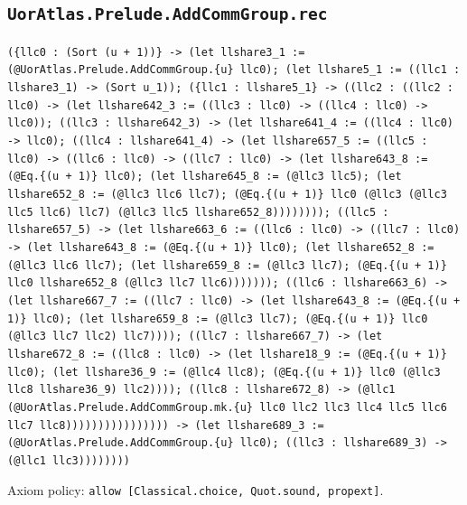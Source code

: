 \documentclass[11pt]{article}
\begin{document}
\subsection*{\texttt{UorAtlas.Prelude.AddCommGroup.rec}}
\noindent\texttt{(\{llc0 : (Sort (u + 1))\} -> (let llshare3\_1 := (@UorAtlas.Prelude.AddCommGroup.\{u\} llc0); (let llshare5\_1 := ((llc1 : llshare3\_1) -> (Sort u\_1)); (\{llc1 : llshare5\_1\} -> ((llc2 : ((llc2 : llc0) -> (let llshare642\_3 := ((llc3 : llc0) -> ((llc4 : llc0) -> llc0)); ((llc3 : llshare642\_3) -> (let llshare641\_4 := ((llc4 : llc0) -> llc0); ((llc4 : llshare641\_4) -> (let llshare657\_5 := ((llc5 : llc0) -> ((llc6 : llc0) -> ((llc7 : llc0) -> (let llshare643\_8 := (@Eq.\{(u + 1)\} llc0); (let llshare645\_8 := (@llc3 llc5); (let llshare652\_8 := (@llc3 llc6 llc7); (@Eq.\{(u + 1)\} llc0 (@llc3 (@llc3 llc5 llc6) llc7) (@llc3 llc5 llshare652\_8)))))))); ((llc5 : llshare657\_5) -> (let llshare663\_6 := ((llc6 : llc0) -> ((llc7 : llc0) -> (let llshare643\_8 := (@Eq.\{(u + 1)\} llc0); (let llshare652\_8 := (@llc3 llc6 llc7); (let llshare659\_8 := (@llc3 llc7); (@Eq.\{(u + 1)\} llc0 llshare652\_8 (@llc3 llc7 llc6))))))); ((llc6 : llshare663\_6) -> (let llshare667\_7 := ((llc7 : llc0) -> (let llshare643\_8 := (@Eq.\{(u + 1)\} llc0); (let llshare659\_8 := (@llc3 llc7); (@Eq.\{(u + 1)\} llc0 (@llc3 llc7 llc2) llc7)))); ((llc7 : llshare667\_7) -> (let llshare672\_8 := ((llc8 : llc0) -> (let llshare18\_9 := (@Eq.\{(u + 1)\} llc0); (let llshare36\_9 := (@llc4 llc8); (@Eq.\{(u + 1)\} llc0 (@llc3 llc8 llshare36\_9) llc2)))); ((llc8 : llshare672\_8) -> (@llc1 (@UorAtlas.Prelude.AddCommGroup.mk.\{u\} llc0 llc2 llc3 llc4 llc5 llc6 llc7 llc8)))))))))))))))) -> (let llshare689\_3 := (@UorAtlas.Prelude.AddCommGroup.\{u\} llc0); ((llc3 : llshare689\_3) -> (@llc1 llc3))))))))}\par
\noindent Axiom policy: \texttt{allow [Classical.choice, Quot.sound, propext]}.\par
\end{document}
